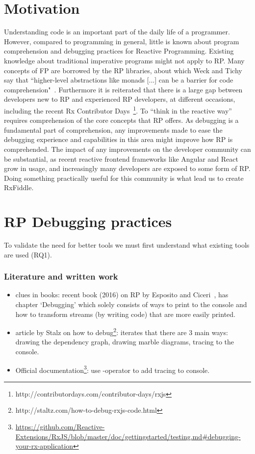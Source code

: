\section{Motivation}
Understanding code is an important part of the daily life of a programmer. However, compared to programming in general, little is known about program comprehension and debugging practices for Reactive Programming. Existing knowledge about traditional imperative programs might not apply to RP. Many concepts of FP are borrowed by the RP libraries, about which Weck and Tichy say that ``higher-level abstractions like monads [...] can be a barrier for code comprehension"~\cite{weck2016visualizing}. Furthermore it is reiterated that there is a large gap between developers new to RP and experienced RP developers, at different occasions, including the recent Rx Contributor Days~\footnote{http://contributordays.com/contributor-days/rxjs}. To ``think in the reactive way'' requires comprehension of the core concepts that RP offers. As debugging is a fundamental part of comprehension, any improvements made to ease the debugging experience and capabilities in this area might improve how RP is comprehended.
The impact of any improvements on the developer community can be substantial, as recent reactive frontend frameworks like Angular and React grow in usage, and increasingly many developers are exposed to some form of RP. Doing something practically useful for this community is what lead us to create RxFiddle.

\section{RP Debugging practices}

To validate the need for better tools we must first understand what existing tools are used (RQ1).

\subsubsection{Literature and written work}
\begin{itemize}
	\item clues in books: recent book (2016) on RP by Esposito and Ciceri~\cite{esposito2016reactive}, has chapter `Debugging' which solely consists of ways to print to the console and how to transform streams (by writing code) that are more easily printed.
	\item article by Stalz on how to debug\footnote{http://staltz.com/how-to-debug-rxjs-code.html}: iterates that there are 3 main ways: drawing the dependency graph, drawing marble diagrams, tracing to the console.
	\item Official documentation\footnote{\url{https://github.com/Reactive-Extensions/RxJS/blob/master/doc/gettingstarted/testing.md\#debugging-your-rx-application}}: use -operator to add tracing to console.
\end{itemize}

